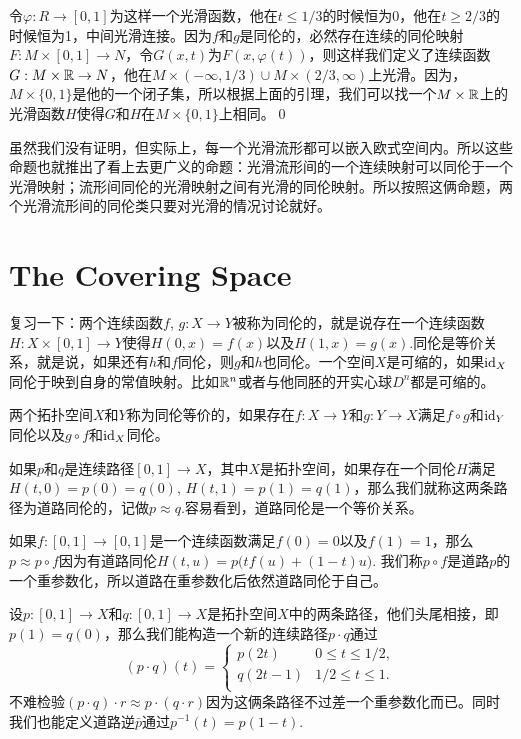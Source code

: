 \proof 令$\varphi:R\to [0,1]$为这样一个光滑函数，他在$t\leq 1/3$的时候恒为0，他在$t\geq 2/3$的时候恒为1，中间光滑连接。因为$f$和$g$是同伦的，必然存在连续的同伦映射$F:M\times [0,1]\to N$，令$G(x,t)$为$F(x,\varphi(t))$，则这样我们定义了连续函数$G:M\times \mathbb{R} \to N$，他在$M\times (-\infty,1/3)\cup M\times (2/3,\infty)$上光滑。因为，$M\times \{0,1\}$是他的一个闭子集，所以根据上面的引理，我们可以找一个$M\times \mathbb{R}$上的光滑函数$H$使得$G$和$H$在$M\times \{0,1\}$上相同。\qed

虽然我们没有证明，但实际上，每一个光滑流形都可以嵌入欧式空间内。所以这些命题也就推出了看上去更广义的命题：光滑流形间的一个连续映射可以同伦于一个光滑映射；流形间同伦的光滑映射之间有光滑的同伦映射。所以按照这俩命题，两个光滑流形间的同伦类只要对光滑的情况讨论就好。

\chapter{The Covering Space}

\textbf{} 复习一下：两个连续函数$f$, $g:X\to Y$被称为{\kaishu 同伦}的，就是说存在一个连续函数$H:X\times [0,1]\to Y$使得$H(0,x)=f(x)$以及$H(1,x)=g(x)$.同伦是等价关系，就是说，如果还有$h$和$f$同伦，则$g$和$h$也同伦。一个空间$X$是可缩的，如果$\operatorname{id}_X$同伦于映到自身的常值映射。比如$\mathbb{R}^n$或者与他同胚的开实心球$D^n$都是可缩的。

两个拓扑空间$X$和$Y$称为同伦等价的，如果存在$f:X\to Y$和$g:Y\to X$满足$f\circ g$和$\operatorname{id}_Y$同伦以及$g\circ f$和$\operatorname{id}_X$同伦。

\para 如果$p$和$q$是连续路径$[0,1]\to X$，其中$X$是拓扑空间，如果存在一个同伦$H$满足$H(t,0)=p(0)=q(0)$, $H(t,1)=p(1)=q(1)$，那么我们就称这两条路径为{\kaishu 道路同伦}的，记做$p \approx q$.容易看到，道路同伦是一个等价关系。

如果$f:[0,1]\to[0,1]$是一个连续函数满足$f(0)=0$以及$f(1)=1$，那么$p\approx p\circ f$因为有道路同伦$H(t,u)=p\bigl(tf(u)+(1-t)u\bigr)$. 我们称$p\circ f$是道路$p$的一个重参数化，所以道路在重参数化后依然道路同伦于自己。

设$p : [0,1] \to X$和$q : [0,1] \to X$是拓扑空间$X$中的两条路径，他们头尾相接，即$p(1)=q(0)$，那么我们能构造一个新的连续路径$p\cdot q$通过
\[
	(p\cdot q)(t)=
	\begin{cases}
		p(2t) &0 \leq t\leq 1/2,\\
		q(2t-1)&1/2 \leq t\leq 1.\\
	\end{cases}
\]
不难检验$(p\cdot q)\cdot r \approx p\cdot (q\cdot r)$因为这俩条路径不过差一个重参数化而已。同时我们也能定义道路逆$\bar{p}$通过$p^{-1}(t)=p(1-t)$.

